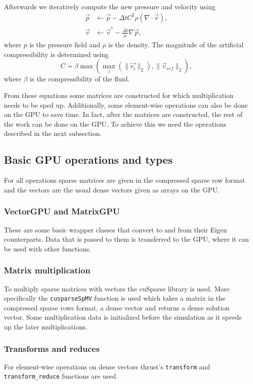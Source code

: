 \documentclass{article}
\begin{document}
Afterwards we iteratively compute the new pressure and velocity using 
\begin{align}
    \vec{p} & \leftarrow \vec{p} - \Delta t C^2  \rho  (\nabla \cdot \vec{v}), \\
    \vec{v} &\leftarrow \vec{v}^* - \frac{\Delta t}{\rho} \nabla \vec{p},
\end{align}
where \(p\) is the pressure field and \(\rho\) is the density. The magnitude of the 
artificial compressibility is determined using 
\begin{equation}
    C = \beta \max(\max_i(\lVert\vec{v_i}\rVert_2),\lVert\vec{v}_{ref}\rVert_2), 
\end{equation}
where \(\beta\) is the compressibility of the fluid.

From these equations some matrices are constructed for which multiplication needs to be 
sped up. Additionally, some element-wise operations can also be done on the GPU to save time.
In fact, after the matrices are constructed, the rest of the work can be done on the GPU.
To achieve this we need the operations described in the next subsection.
\subsection{Basic GPU operations and types}
For all operations sparse matrices are given in the compressed sparse row format and the vectors
are the usual dense vectors given as arrays on the GPU.
\subsubsection{VectorGPU and MatrixGPU}
These are some basic wrapper classes that convert to and from their Eigen counterparts.
Data that is passed to them is transferred to the GPU, where it can be used with other functions.
\subsubsection{Matrix multiplication}
To multiply sparse matrices with vectors the cuSparse library is used. More specifically the 
\verb|cusparseSpMV| function is used which takes a matrix in the compressed sparse rows format, 
a dense vector and returns a dense solution vector. Some multiplication data is initialized 
before the simulation as it speeds up the later multiplications. 
\subsubsection{Transforms and reduces}
For element-wise operations on dense vectors thrust's \verb|transform| and \verb|transform_reduce| 
functions are used.
\end{document}
